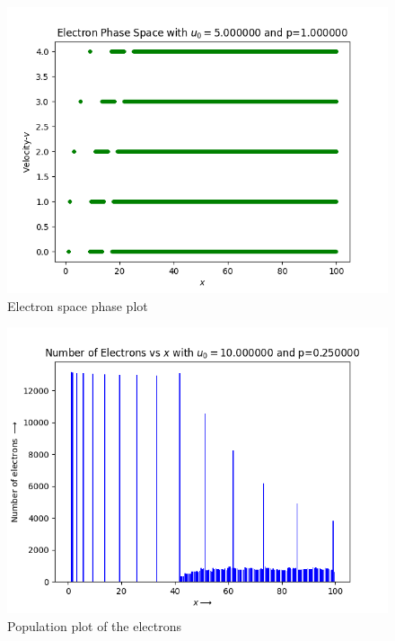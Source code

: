 \documentclass[11pt, a4paper]{article}
\begin{document}
\begin{figure}[!tbh]
\centering
\includegraphics[scale=0.6]{elec_phasa_space2.png} 
\caption{Electron space phase plot}
\label{fig:1fig_3}
\end{figure}

\begin{figure}[!tbh]
\centering
\includegraphics[scale=0.56]{hist3_elec_density.png} 
\caption{Population plot of the electrons}
\label{fig:2fig_1}
\end{figure} 
\end{document}
